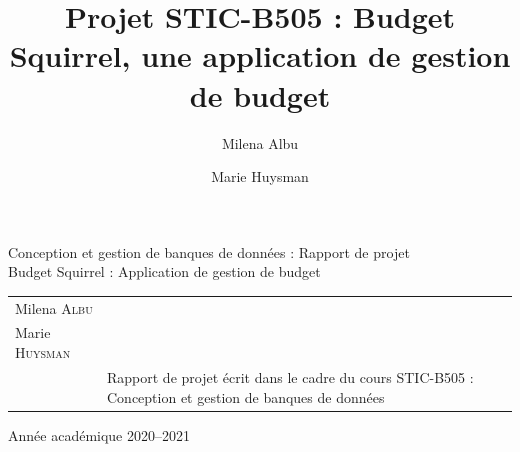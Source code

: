 \documentclass[a4paper,12pt]{article}
\title{Projet STIC-B505 : Budget Squirrel, une application de gestion de budget}
\author{Milena Albu \and Marie Huysman} %
\date{} %
\begin{document}
\sloppy

\begin{titlepage} %
\singlespacing %

\begin{figure}[h]
\noindent
{}
\end{figure}

\vfill %


\begin{center}
\LARGE{Conception et gestion de banques de données : Rapport de projet}\\ %
\Large{ Budget Squirrel : Application de gestion de budget}
\vspace{.5cm}
\end{center}

\vfill

\begin{tabular}{b{5.5cm}b{7.5cm}} %
 \\ Milena \textsc{Albu} \\ Marie \textsc{Huysman} \\ & Rapport de projet écrit dans le cadre du cours STIC-B505 : Conception et gestion de banques de données \\
\end{tabular}

\vfill

\begin{center}
Année académique 2020--2021 %
\end{center}

\end{titlepage}
\end{document}
